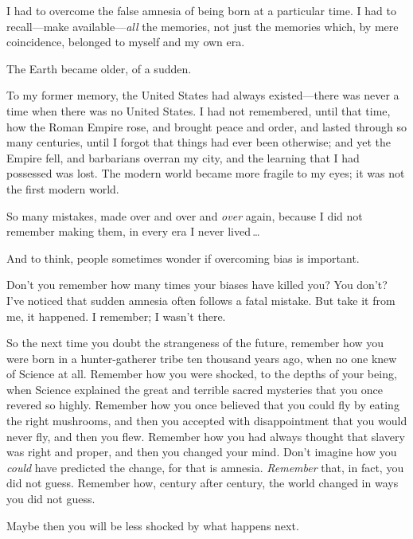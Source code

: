 {
 I had to overcome the false amnesia of being born at a particular
time. I had to recall---make available---\textit{all} the memories, not
just the memories which, by mere coincidence, belonged to myself and my
own era.}

{
 The Earth became older, of a sudden.}

{
 To my former memory, the United States had always existed---there
was never a time when there was no United States. I had not remembered,
until that time, how the Roman Empire rose, and brought peace and
order, and lasted through so many centuries, until I forgot that things
had ever been otherwise; and yet the Empire fell, and barbarians
overran my city, and the learning that I had possessed was lost. The
modern world became more fragile to my eyes; it was not the first
modern world.}

{
 So many mistakes, made over and over and \textit{over} again,
because I did not remember making them, in every era I never lived\,\ldots}

{
 And to think, people sometimes wonder if overcoming bias is
important.}

{
 Don't you remember how many times your biases have
killed you? You don't? I've noticed
that sudden amnesia often follows a fatal mistake. But take it from me,
it happened. I remember; I wasn't there.}

{
 So the next time you doubt the strangeness of the future, remember
how you were born in a hunter-gatherer tribe ten thousand years ago,
when no one knew of Science at all. Remember how you were shocked, to
the depths of your being, when Science explained the great and terrible
sacred mysteries that you once revered so highly. Remember how you once
believed that you could fly by eating the right mushrooms, and then you
accepted with disappointment that you would never fly, and then you
flew. Remember how you had always thought that slavery was right and
proper, and then you changed your mind. Don't imagine
how you \textit{could} have predicted the change, for that is amnesia.
\textit{Remember} that, in fact, you did not guess. Remember how,
century after century, the world changed in ways you did not guess.}

{
 Maybe then you will be less shocked by what happens next.}

\myendsectiontext


\bigskip

\label{explain_worship_ignore}

